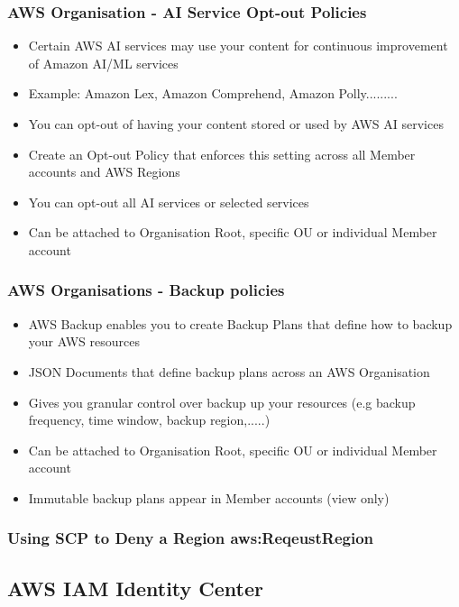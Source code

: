 \subsubsection{AWS Organisation - AI Service Opt-out Policies}
\begin{itemize}
    \item Certain AWS AI services may use your content for continuous improvement of Amazon AI/ML services
    \item Example: Amazon Lex, Amazon Comprehend, Amazon Polly.........
    \item You can opt-out of having your content stored or used by AWS AI services
    \item Create an Opt-out Policy that enforces this setting across all Member accounts and AWS Regions
    \item You can opt-out all AI services or selected services
    \item Can be attached to Organisation Root, specific OU or individual Member account
\end{itemize}

\subsubsection{AWS Organisations - Backup policies}
\begin{itemize}
    \item AWS Backup enables you to create Backup Plans that define how to backup your AWS resources
    \item JSON Documents that define backup plans across an AWS Organisation
    \item Gives you granular control over backup up your resources (e.g backup frequency, time window, backup region,.....)
    \item Can be attached to Organisation Root, specific OU or individual Member account
    \item Immutable backup plans appear in Member accounts (view only)
\end{itemize}

\subsubsection{Using SCP to Deny a Region aws:ReqeustRegion}

\subsection{AWS IAM Identity Center}

